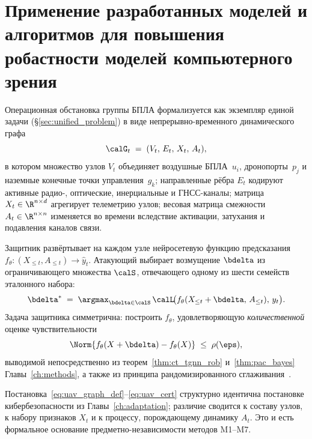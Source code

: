 \section{Применение разработанных моделей и алгоритмов для повышения робастности моделей компьютерного зрения}
\label{sec:uav_graph}

Операционная обстановка группы БПЛА формализуется как экземпляр
единой задачи (\S\ref{sec:unified_problem})
в виде непрерывно-временного динамического графа
\begin{equation}
\calG_t \;=\; (V_t,\,E_t,\,X_t,\,A_t),
\label{eq:uav_graph_def}
\end{equation}
в котором множество узлов $V_t$ объединяет воздушные БПЛА~$u_i$,
дронопорты~$p_j$ и наземные конечные точки управления~$g_k$; направленные
рёбра $E_t$ кодируют активные радио-, оптические, инерциальные и
ГНСС-каналы; матрица $X_t \in \R^{n\times d}$ агрегирует телеметрию узлов;
весовая матрица смежности $A_t \in \R^{n\times n}$ изменяется во времени
вследствие активации, затухания и подавления каналов связи.

Защитник развёртывает на каждом узле нейросетевую функцию предсказания
$f_{\theta}\colon (X_{\le t},A_{\le t}) \to \hat{y}_t$. Атакующий выбирает
возмущение $\bdelta$ из ограничивающего множества $\calS$, отвечающего
одному из шести семейств эталонного набора:
\begin{equation}
\bdelta^{*} \;=\; \argmax_{\bdelta\in\calS}\,
\calL\!\bigl(f_{\theta}(X_{\le t}+\bdelta,\,A_{\le t}),\,y_t\bigr).
\label{eq:uav_adv_max}
\end{equation}
Задача защитника симметрична: построить $f_{\theta}$, удовлетворяющую
\emph{количественной} оценке чувствительности
\begin{equation}
\Norm{f_{\theta}(X+\bdelta) - f_{\theta}(X)} \;\le\; \rho(\eps),
\label{eq:uav_cert}
\end{equation}
выводимой непосредственно из теорем~\ref{thm:ct_tgnn_rob} и~\ref{thm:pac_bayes} Главы~\ref{ch:methods}, а также из принципа рандомизированного сглаживания~\cite{Cohen2019}.

Постановка~\eqref{eq:uav_graph_def}--\eqref{eq:uav_cert} структурно
идентична постановке кибербезопасности из Главы~\ref{ch:adaptation}; различие
сводится к составу узлов, к набору признаков $X_t$ и к процессу,
порождающему динамику $A_t$. Это и есть формальное основание
предметно-независимости методов \textsf{M1}--\textsf{M7}.


